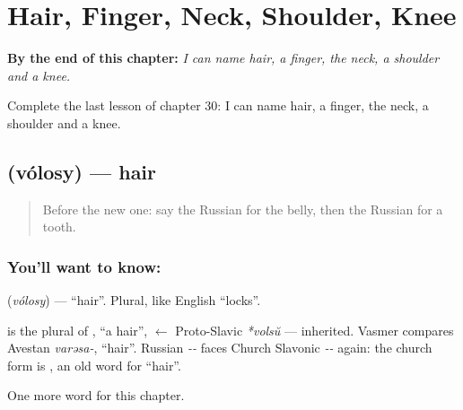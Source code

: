 
\chapter{Hair, Finger, Neck, Shoulder, Knee}
\label{ch:ru-hair-finger-neck-shoulder-knee}

\begin{chapteropening}
\textbf{By the end of this chapter:} \emph{I can name hair, a finger, the neck, a shoulder and a knee.}

Complete the last lesson of chapter 30: I can name hair, a finger, the neck, a shoulder and a knee.
\end{chapteropening}

\section[\texorpdfstring{\ru{волосы} (vólosy)}{волосы (vólosy)}]{ (vólosy) — hair}

\label{lesson:RU-C30-hair}



\begin{quote}
Before the new one: say the Russian for the belly, then the Russian for a tooth.
\end{quote}

\subsection*{You'll want to know: }
\textbf{} (\emph{vólosy}) — \textquotedblleft{}hair\textquotedblright{}. Plural, like English \textquotedblleft{}locks\textquotedblright{}.

\begin{cousinweb}
\textbf{} is the plural of \emph{}, \textquotedblleft{}a hair\textquotedblright{}, $\leftarrow$ Proto-Slavic \emph{*volsŭ} — inherited. Vasmer compares Avestan \emph{varəsa-}, \textquotedblleft{}hair\textquotedblright{}. Russian \emph{--} faces Church Slavonic \emph{--} again: the church form is \emph{}, an old word for \textquotedblleft{}hair\textquotedblright{}.
\end{cousinweb}

\begin{grammarlens}[title={What you've built}]
One more word for this chapter.
\end{grammarlens}

